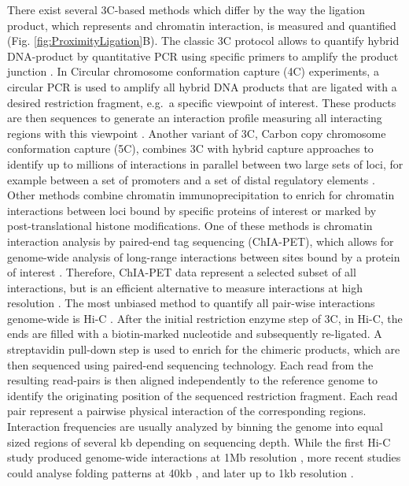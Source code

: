 \documentclass[a4paper,twoside=true,openright,parskip=full,chapterprefix=true,11pt,headings=normal,bibliography=totoc,listof=totoc,titlepage=on,captions=tableabove,draft=false]{scrreprt}
\theoremstyle{definition}
\theoremstyle{definition}
\theoremstyle{definition}
\theoremstyle{remark}
\begin{document}
There exist several 3C-based methods which differ by the way the
ligation product, which represents and chromatin interaction, is
measured and quantified (Fig. \ref{fig:ProximityLigation}B). The classic
3C protocol allows to quantify hybrid DNA-product by quantitative PCR
using specific primers to amplify the product junction
\citep{Dekker2002}. In Circular chromosome conformation capture (4C)
experiments, a circular PCR is used to amplify all hybrid DNA products
that are ligated with a desired restriction fragment, e.g.~a specific
viewpoint of interest. These products are then sequences to generate an
interaction profile measuring all interacting regions with this
viewpoint \citep{Simonis2006, Noordermeer2011}. Another variant of 3C,
Carbon copy chromosome conformation capture (5C), combines 3C with
hybrid capture approaches to identify up to millions of interactions in
parallel between two large sets of loci, for example between a set of
promoters and a set of distal regulatory elements
\citep{Dostie2006, Sanyal2012}. Other methods combine chromatin
immunoprecipitation to enrich for chromatin interactions between loci
bound by specific proteins of interest or marked by post-translational
histone modifications. One of these methods is chromatin interaction
analysis by paired-end tag sequencing (ChIA-PET), which allows for
genome-wide analysis of long-range interactions between sites bound by a
protein of interest \citep{Fullwood2009}. Therefore, ChIA-PET data
represent a selected subset of all interactions, but is an efficient
alternative to measure interactions at high resolution \citep{Tang2015}.
The most unbiased method to quantify all pair-wise interactions
genome-wide is Hi-C \citep{Lieberman-Aiden2009}. After the initial
restriction enzyme step of 3C, in Hi-C, the ends are filled with a
biotin-marked nucleotide and subsequently re-ligated. A streptavidin
pull-down step is used to enrich for the chimeric products, which are
then sequenced using paired-end sequencing technology. Each read from
the resulting read-pairs is then aligned independently to the reference
genome to identify the originating position of the sequenced restriction
fragment. Each read pair represent a pairwise physical interaction of
the corresponding regions. Interaction frequencies are usually analyzed
by binning the genome into equal sized regions of several kb depending
on sequencing depth. While the first Hi-C study produced genome-wide
interactions at 1Mb resolution \citep{Lieberman-Aiden2009}, more recent
studies could analyse folding patterns at 40kb \citep{Dixon2012}, and
later up to 1kb resolution \citep{Rao2014}.
\end{document}

